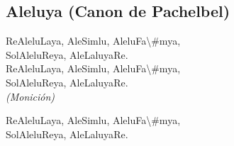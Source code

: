 \subsection{Aleluya (Canon de Pachelbel)}
\begin{center}

{\Large
\ac{Re}Alelu\ac{La}ya, Ale\ac{Sim}lu, Alelu\ac{Fa\#m}ya,\\ 
\ac{Sol}Alelu\ac{Re}ya, Ale\ac{La}luya\ac{Re}. \\

\ac{Re}Alelu\ac{La}ya, Ale\ac{Sim}lu, Alelu\ac{Fa\#m}ya,\\ 
\ac{Sol}Alelu\ac{Re}ya, Ale\ac{La}luya\ac{Re}. \\

\vspace{2em}
\textit{(Monición)}\\
\vspace{2em}

\ac{Re}Alelu\ac{La}ya, Ale\ac{Sim}lu, Alelu\ac{Fa\#m}ya,\\ 
\ac{Sol}Alelu\ac{Re}ya, Ale\ac{La}luya\ac{Re}. \\

}
\end{center}
